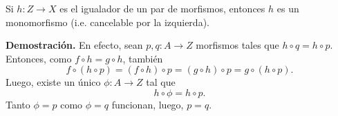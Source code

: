 \documentclass[10pt]{article}
\newtheorem[M]{teo}{Teorema}[section]
\newtheorem[M]{listaObj}[teo]{Lista de deseos}
\newtheorem[M]{preg}[teo]{Pregunta}
\newtheorem[M]{lema}[teo]{Lema}
\newtheorem[M]{hip}[teo]{Hipótesis}
\newtheorem[M]{prop}[teo]{Proposición}
\newtheorem[M]{obs}[teo]{Observación}
\newtheorem[M]{cor}[teo]{Corolario}
\newtheorem[M]{defi}[teo]{Definición}
\newtheorem[M]{notacion}[teo]{Notación}
\newtheorem[M]{nota}[teo]{Nota}
\begin{document}
\begin{prop}
Si $h: Z \longrightarrow X$ es el igualador de un par de morfismos,
entonces $h$ es un monomorfismo (i.e. cancelable por la izquierda).
\end{prop}
\noindent
\textbf{Demostración.}
En efecto, sean $p, q: A \longrightarrow Z$ morfismos tales que 
$h \circ q = h \circ p$.
Entonces, como $f \circ h = g \circ h$, también
\[
f \circ (h \circ p) = (f \circ h) \circ p 
= (g \circ h) \circ p = g \circ (h \circ p).
\]
Luego, existe un único $\phi : A \longrightarrow Z$ tal que 
\[
h \circ \phi = h \circ p.
\]
Tanto $\phi = p$ como $\phi = q$ funcionan, luego, $p = q$.

\begin{center}
\begin{tikzpicture}[x=0.75pt,y=0.75pt,yscale=-1,xscale=1]



\end{tikzpicture}
\end{center}
\end{document}
